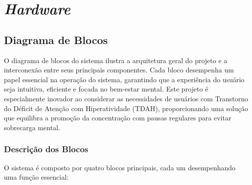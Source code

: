 \documentclass{article}
\begin{document}
\section{\textit{Hardware}}

\subsection{Diagrama de Blocos}

O diagrama de blocos do sistema ilustra a arquitetura geral do projeto e a interconexão entre seus principais componentes. Cada bloco desempenha um papel essencial na operação do sistema, garantindo que a experiência do usuário seja intuitiva, eficiente e focada no bem-estar mental. Este projeto é especialmente inovador ao considerar as necessidades de usuários com Transtorno do Déficit de Atenção com Hiperatividade (TDAH), proporcionando uma solução que equilibra a promoção da concentração com pausas regulares para evitar sobrecarga mental.
\subsubsection{Descrição dos Blocos}

O sistema é composto por quatro blocos principais, cada um desempenhando uma função essencial:
\end{document}
